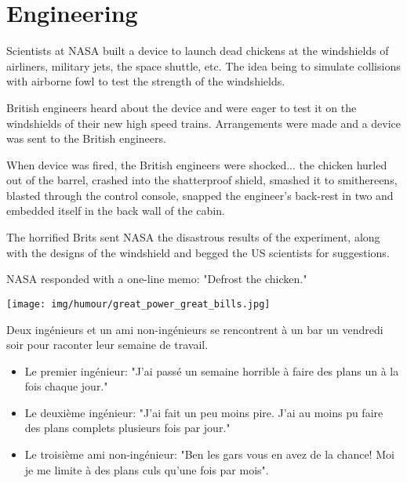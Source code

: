 	\pagebreak
	\section{Engineering}

	Scientists at NASA built a device to launch dead chickens at the windshields of airliners, military jets, the space shuttle, etc. The idea being to simulate collisions with airborne fowl to test the strength of the windshields. 
	
	British engineers heard about the device and were eager to test it on the windshields of their new high speed trains. Arrangements were made and a device was sent to the British engineers.
	
	When device was fired, the British engineers were shocked... the chicken hurled out of the barrel, crashed into the shatterproof shield, smashed it to smithereens, blasted through the control console, snapped the engineer's back-rest in two and embedded itself in the back wall of the cabin.
	
	The horrified Brits sent NASA the disastrous results of the experiment, along with the designs of the windshield and begged the US scientists for suggestions.
	
	NASA responded with a one-line memo: "Defrost the chicken."

	\begin{center}\underline{\hspace{5 cm}}\end{center}
	
	\begin{center}
	\texttt{[image: img/humour/great\_power\_great\_bills.jpg]}
	\end{center}

	\begin{center}\underline{\hspace{5 cm}}\end{center}

Deux ingénieurs et un ami non-ingénieurs se rencontrent à un bar un vendredi soir pour raconter leur semaine de travail.

	\begin{itemize}
		\item Le premier ingénieur: "J'ai passé un semaine horrible à faire des plans un à la fois chaque jour."
	
		\item Le deuxième ingénieur: "J'ai fait un peu moins pire. J'ai au moins pu faire des plans complets plusieurs fois par jour."
	
		\item Le troisième ami non-ingénieur: "Ben les gars vous en avez de la chance! Moi je me limite à des plans culs qu'une fois par mois".
	\end{itemize}
	\begin{center}\underline{\hspace{5 cm}}\end{center}

